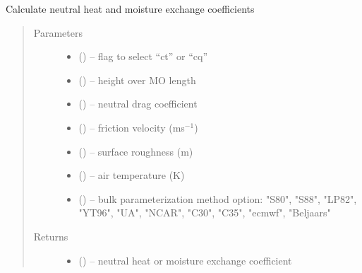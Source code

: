 \documentclass[letterpaper,10pt,english]{sphinxmanual}
\begin{document}

\begin{fulllineitems}
\label{\detokenize{index:flux_subs.ctcqn_calc}}
Calculate neutral heat and moisture exchange coefficients
\begin{quote}\begin{description}
\item[{Parameters}] \leavevmode\begin{itemize}
\item {} 
 (\href{https://docs.python.org/3/library/functions.html\#float}{}) -- flag to select ``ct'' or ``cq''

\item {} 
 (\href{https://docs.python.org/3/library/functions.html\#float}{}) -- height over MO length

\item {} 
 (\href{https://docs.python.org/3/library/functions.html\#float}{}) -- neutral drag coefficient

\item {} 
 (\href{https://docs.python.org/3/library/functions.html\#float}{}) -- friction velocity (ms$^{-1}$)

\item {} 
 (\href{https://docs.python.org/3/library/functions.html\#float}{}) -- surface roughness (m)

\item {} 
 (\href{https://docs.python.org/3/library/functions.html\#float}{}) -- air temperature (K)

\item {} 
 (\href{https://docs.python.org/3/library/stdtypes.html\#str}{}) -- bulk parameterization method option: "S80", "S88", "LP82", "YT96", "UA", "NCAR", "C30", "C35", "ecmwf", "Beljaars"

\end{itemize}

\item[{Returns}] \leavevmode
\begin{itemize}
\item {} 
 (\href{https://docs.python.org/3/library/functions.html\#float}{}) -- neutral heat or moisture exchange coefficient


\end{itemize}
\end{description}
\end{quote}
\end{fulllineitems}
\end{document}
